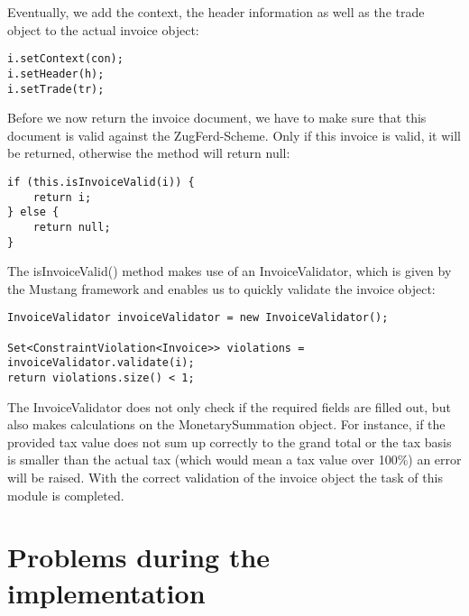 Eventually, we add the context, the header information as well as the trade object to the actual invoice object:

\begin{lstlisting}
i.setContext(con);
i.setHeader(h);
i.setTrade(tr);
\end{lstlisting}

Before we now return the invoice document, we have to make sure that this document is valid against the ZugFerd-Scheme. Only if this invoice is valid, it will be returned, otherwise the method will return null:

\begin{lstlisting}
if (this.isInvoiceValid(i)) {
    return i;
} else {
    return null;
}
\end{lstlisting}

The isInvoiceValid() method makes use of an InvoiceValidator, which is given by the Mustang framework and enables us to quickly validate the invoice object:

\begin{lstlisting}
InvoiceValidator invoiceValidator = new InvoiceValidator();

Set<ConstraintViolation<Invoice>> violations = invoiceValidator.validate(i);
return violations.size() < 1;
\end{lstlisting}

The InvoiceValidator does not only check if the required fields are filled out, but also makes calculations on the MonetarySummation object. For instance, if the provided tax value does not sum up correctly to the grand total or the tax basis is smaller than the actual tax (which would mean a tax value over 100\%) an error will be raised.
With the correct validation of the invoice object the task of this module is completed. 

\section{Problems during the implementation}